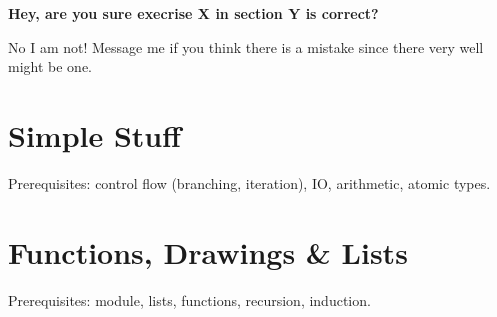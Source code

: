 \begin{flushleft}
\textbf{Hey, are you sure execrise X in section Y is correct?}
\end{flushleft}
\begin{flushright}
No I am not! Message me if you think there is a mistake since there very well might be one.
\end{flushright}

\tableofcontents

\section{Simple Stuff}
Prerequisites: control flow (branching, iteration), IO, arithmetic, atomic types.


\section{Functions, Drawings \& Lists}
Prerequisites:  module, lists, functions, recursion, induction.


\clearpage
\doclicenseThis


